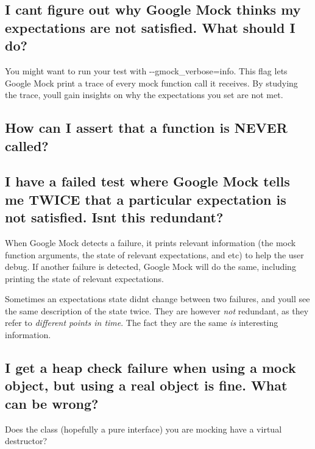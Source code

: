 \subsection*{I can\textquotesingle{}t figure out why Google Mock thinks my expectations are not satisfied. What should I do?}

You might want to run your test with {\ttfamily -\/-\/gmock\+\_\+verbose=info}. This flag lets Google Mock print a trace of every mock function call it receives. By studying the trace, you\textquotesingle{}ll gain insights on why the expectations you set are not met.

\subsection*{How can I assert that a function is N\+E\+V\+ER called?}


\begin{DoxyCode}{0}
\end{DoxyCode}


\subsection*{I have a failed test where Google Mock tells me T\+W\+I\+CE that a particular expectation is not satisfied. Isn\textquotesingle{}t this redundant?}

When Google Mock detects a failure, it prints relevant information (the mock function arguments, the state of relevant expectations, and etc) to help the user debug. If another failure is detected, Google Mock will do the same, including printing the state of relevant expectations.

Sometimes an expectation\textquotesingle{}s state didn\textquotesingle{}t change between two failures, and you\textquotesingle{}ll see the same description of the state twice. They are however {\itshape not} redundant, as they refer to {\itshape different points in time}. The fact they are the same {\itshape is} interesting information.

\subsection*{I get a heap check failure when using a mock object, but using a real object is fine. What can be wrong?}

Does the class (hopefully a pure interface) you are mocking have a virtual destructor?

